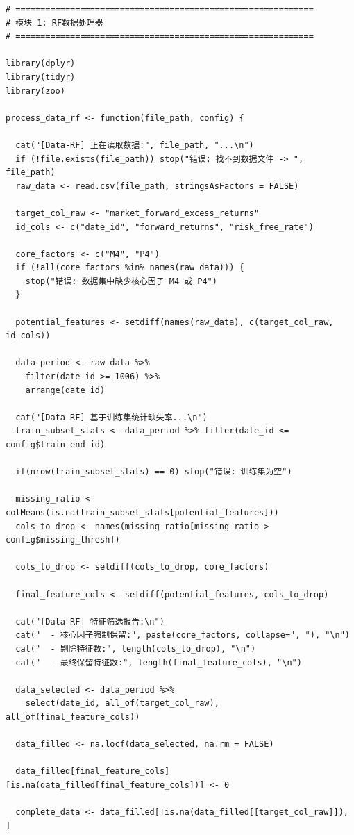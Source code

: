 \documentclass[11pt, a4paper]{article}
\begin{document}
\begin{verbatim}
# ============================================================
# 模块 1: RF数据处理器
# ============================================================

library(dplyr)
library(tidyr)
library(zoo)

process_data_rf <- function(file_path, config) {
  
  cat("[Data-RF] 正在读取数据:", file_path, "...\n")
  if (!file.exists(file_path)) stop("错误: 找不到数据文件 -> ", file_path)
  raw_data <- read.csv(file_path, stringsAsFactors = FALSE)
  
  target_col_raw <- "market_forward_excess_returns"
  id_cols <- c("date_id", "forward_returns", "risk_free_rate")
  
  core_factors <- c("M4", "P4")
  if (!all(core_factors %in% names(raw_data))) {
    stop("错误: 数据集中缺少核心因子 M4 或 P4")
  }
  
  potential_features <- setdiff(names(raw_data), c(target_col_raw, id_cols))
  
  data_period <- raw_data %>%
    filter(date_id >= 1006) %>%
    arrange(date_id)
  
  cat("[Data-RF] 基于训练集统计缺失率...\n")
  train_subset_stats <- data_period %>% filter(date_id <= config$train_end_id)
  
  if(nrow(train_subset_stats) == 0) stop("错误: 训练集为空")
  
  missing_ratio <- colMeans(is.na(train_subset_stats[potential_features]))
  cols_to_drop <- names(missing_ratio[missing_ratio > config$missing_thresh])
  
  cols_to_drop <- setdiff(cols_to_drop, core_factors)
  
  final_feature_cols <- setdiff(potential_features, cols_to_drop)
  
  cat("[Data-RF] 特征筛选报告:\n")
  cat("  - 核心因子强制保留:", paste(core_factors, collapse=", "), "\n")
  cat("  - 剔除特征数:", length(cols_to_drop), "\n")
  cat("  - 最终保留特征数:", length(final_feature_cols), "\n")
  
  data_selected <- data_period %>% 
    select(date_id, all_of(target_col_raw), all_of(final_feature_cols))
  
  data_filled <- na.locf(data_selected, na.rm = FALSE)
  
  data_filled[final_feature_cols][is.na(data_filled[final_feature_cols])] <- 0
  
  complete_data <- data_filled[!is.na(data_filled[[target_col_raw]]), ]
  

\end{verbatim}
\end{document}
